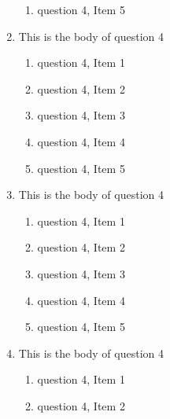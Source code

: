 \documentclass{article}
\begin{document}
\begin{enumerate}
\begin{enumerate}
    \item
    question 4, Item 5

  \end{enumerate}

\item
This is the body of question 4

  \begin{enumerate}

    \item
    question 4, Item 1

    \item
    question 4, Item 2

    \item
    question 4, Item 3

    \item
    question 4, Item 4

    \item
    question 4, Item 5

  \end{enumerate}

\item
This is the body of question 4

  \begin{enumerate}

    \item
    question 4, Item 1

    \item
    question 4, Item 2

    \item
    question 4, Item 3

    \item
    question 4, Item 4

    \item
    question 4, Item 5

  \end{enumerate}

\item
This is the body of question 4

  \begin{enumerate}

    \item
    question 4, Item 1

    \item
    question 4, Item 2


\end{enumerate}
\end{enumerate}
\end{document}
